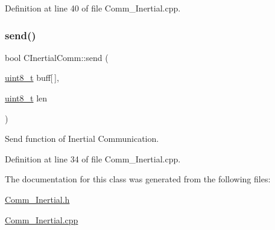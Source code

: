 Definition at line 40 of file Comm\+\_\+\+Inertial.\+cpp.

\mbox{\label{class_c_inertial_comm_ad40aa8ed083373c27fdc1aa11dfc319e}} 
\subsubsection{\texorpdfstring{send()}{send()}}
{\footnotesize\ttfamily bool C\+Inertial\+Comm\+::send (\begin{DoxyParamCaption}\item[{\mbox{\hyperlink{_a_d_a_s___types_8h_aba7bc1797add20fe3efdf37ced1182c5}{uint8\+\_\+t}}}]{buff\mbox{[}$\,$\mbox{]},  }\item[{\mbox{\hyperlink{_a_d_a_s___types_8h_aba7bc1797add20fe3efdf37ced1182c5}{uint8\+\_\+t}}}]{len }\end{DoxyParamCaption})}



Send function of Inertial Communication. 



Definition at line 34 of file Comm\+\_\+\+Inertial.\+cpp.



The documentation for this class was generated from the following files\+:\begin{DoxyCompactItemize}
\item 
\mbox{\hyperlink{_comm___inertial_8h}{Comm\+\_\+\+Inertial.\+h}}\item 
\mbox{\hyperlink{_comm___inertial_8cpp}{Comm\+\_\+\+Inertial.\+cpp}}\end{DoxyCompactItemize}
